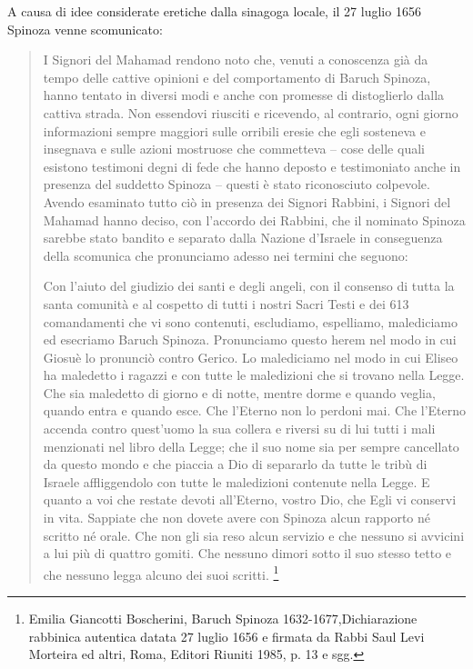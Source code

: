 A causa di idee considerate eretiche dalla sinagoga locale, il 27 luglio 1656 Spinoza venne scomunicato:
\begin{quotation}
	\small I Signori del Mahamad rendono noto che, venuti a conoscenza già da tempo delle cattive opinioni e del comportamento di Baruch Spinoza, hanno tentato in diversi modi e anche con promesse di distoglierlo dalla cattiva strada. Non essendovi riusciti e ricevendo, al contrario, ogni giorno informazioni sempre maggiori sulle orribili eresie che egli sosteneva e insegnava e sulle azioni mostruose che commetteva – cose delle quali esistono testimoni degni di fede che hanno deposto e testimoniato anche in presenza del suddetto Spinoza – questi è stato riconosciuto colpevole. Avendo esaminato tutto ciò in presenza dei Signori Rabbini, i Signori del Mahamad hanno deciso, con l'accordo dei Rabbini, che il nominato Spinoza sarebbe stato bandito e separato dalla Nazione d'Israele in conseguenza della scomunica che pronunciamo adesso nei termini che seguono:
	
	Con l'aiuto del giudizio dei santi e degli angeli, con il consenso di tutta la santa comunità e al cospetto di tutti i nostri Sacri Testi e dei 613 comandamenti che vi sono contenuti, escludiamo, espelliamo, malediciamo ed esecriamo Baruch Spinoza. Pronunciamo questo herem nel modo in cui Giosuè lo pronunciò contro Gerico. Lo malediciamo nel modo in cui Eliseo ha maledetto i ragazzi e con tutte le maledizioni che si trovano nella Legge. Che sia maledetto di giorno e di notte, mentre dorme e quando veglia, quando entra e quando esce. Che l'Eterno non lo perdoni mai. Che l'Eterno accenda contro quest'uomo la sua collera e riversi su di lui tutti i mali menzionati nel libro della Legge; che il suo nome sia per sempre cancellato da questo mondo e che piaccia a Dio di separarlo da tutte le tribù di Israele affliggendolo con tutte le maledizioni contenute nella Legge. E quanto a voi che restate devoti all'Eterno, vostro Dio, che Egli vi conservi in vita. Sappiate che non dovete avere con Spinoza alcun rapporto né scritto né orale. Che non gli sia reso alcun servizio e che nessuno si avvicini a lui più di quattro gomiti. Che nessuno dimori sotto il suo stesso tetto e che nessuno legga alcuno dei suoi scritti. \footnote{ Emilia Giancotti Boscherini, Baruch Spinoza 1632-1677,Dichiarazione rabbinica autentica datata 27 luglio 1656 e firmata da Rabbi Saul Levi Morteira ed altri, Roma, Editori Riuniti 1985, p. 13 e sgg.}
\end{quotation}

